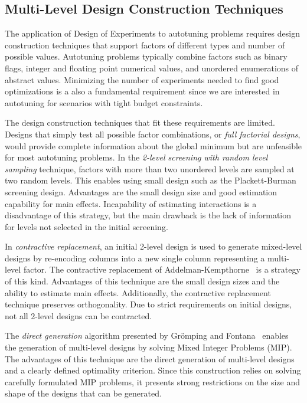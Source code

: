 \documentclass[conference]{IEEEtran}
\begin{document}
\subsection{Multi-Level Design Construction Techniques}
\label{sec:org5b55232}
The application of Design of Experiments to autotuning problems requires design
construction techniques that support factors of different types and number of
possible values. Autotuning problems typically combine factors such as binary
flags, integer and floating point numerical values, and unordered enumerations
of abstract values. Minimizing the number of experiments needed to find good
optimizations is a also a fundamental requirement since we are interested in
autotuning for scenarios with tight budget constraints.

The design construction techniques that fit these requirements are limited.
Designs that simply test all possible factor combinations, or \emph{full factorial
designs}, would provide complete information about the global minimum but are
unfeasible for most autotuning problems. In the \emph{2-level screening with random
level sampling} technique, factors with more than two unordered levels are
sampled at two random levels. This enables using small design such as the
Plackett-Burman~\cite{plackett1946design} screening design. Advantages are
the small design size and good estimation capability for main effects.
Incapability of estimating interactions is a disadvantage of this strategy, but
the main drawback is the lack of information for levels not selected in the
initial screening.

In \emph{contractive replacement}, an initial 2-level design is used to generate
mixed-level designs by re-encoding columns into a new single column representing
a multi-level factor. The contractive replacement of
Addelman-Kempthorne~\cite{addelman1961some} is a strategy of this kind.
Advantages of this technique are the small design sizes and the ability to
estimate main effects. Additionally, the contractive replacement technique
preserves orthogonality. Due to strict requirements on initial designs, not all
2-level designs can be contracted.

The \emph{direct generation} algorithm presented by Grömping and
Fontana~\cite{ulrike2018algorithm} enables the generation of multi-level
designs by solving Mixed Integer Problems (MIP). The advantages of this
technique are the direct generation of multi-level designs and a clearly defined
optimality criterion. Since this construction relies on solving carefully
formulated MIP problems, it presents strong restrictions on the size and shape
of the designs that can be generated.
\end{document}
